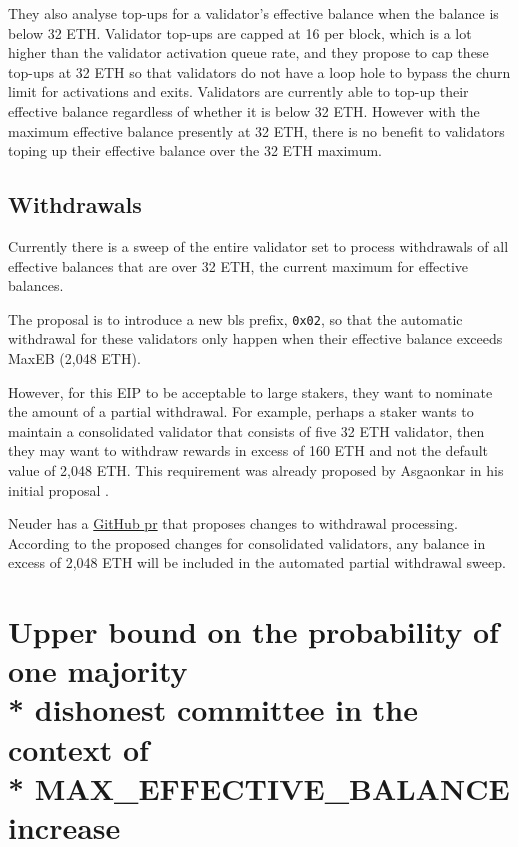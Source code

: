 \documentclass{article}
\begin{document}
They also analyse top-ups for a validator's effective balance when the balance
is below 32 ETH. Validator top-ups are capped at 16 per block, which is a lot
higher than the validator activation queue rate, and they propose to cap these
top-ups at 32 ETH so that validators do not have a loop hole to bypass the
churn limit for activations and exits. Validators are currently able to top-up
their effective balance regardless of whether it is below 32 ETH. However with
the maximum effective balance presently at 32 ETH, there is no benefit to
validators toping up their effective balance over the 32 ETH maximum. 

\subsection{Withdrawals}
Currently there is a sweep of the entire validator set to process withdrawals
of all effective balances that are over 32 ETH, the current maximum for
effective balances. 

The proposal is to introduce a new \gls{bls} prefix, \texttt{0x02}, so that the
automatic withdrawal for these validators only happen when their effective
balance exceeds MaxEB (2,048 ETH). 

However, for this EIP to be acceptable to large stakers, they want to nominate
the amount of a partial withdrawal. For example, perhaps a staker wants to
maintain a consolidated validator that consists of five 32 ETH validator, then
they may want to withdraw rewards in excess of 160 ETH and not the default
value of 2,048 ETH. This requirement was already proposed by Asgaonkar in his
initial proposal \cite{Asgaonkar2023}.

Neuder has a \href{https://github.com/michaelneuder/consensus-specs/pull/3/files#diff-1cdf2318cbed64bdc20bd25631130be090a72ca7ff4f05bbc74c0c63a634e0f1R3709}{GitHub \gls{pr}} that proposes changes to withdrawal processing. According to the proposed changes for consolidated validators, any balance in excess of 2,048 ETH will be included in the automated partial withdrawal sweep.

\section{Upper bound on the probability of one majority \\* dishonest committee
in the context of \\* MAX\_EFFECTIVE\_BALANCE increase}
\end{document}
